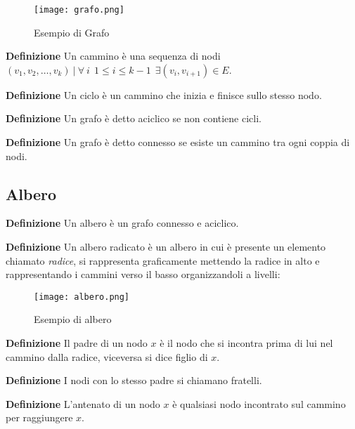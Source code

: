 \documentclass{article}
\begin{document}
\begin{figure}[ht]
    \centering
    \texttt{[image: grafo.png]}
    \caption{Esempio di Grafo}
    \label{fig:grafo}
\end{figure}

\noindent\textbf{Definizione} Un cammino è una sequenza di nodi $(v_1,v_2,\ldots,v_k)\ |\ \forall\ i\ \ 1\leq i\leq k-1\ \ \exists(v_i,v_{i+1})\in E $.\newline 

\noindent\textbf{Definizione} Un ciclo è un cammino che inizia e finisce sullo stesso nodo.\newline

\noindent\textbf{Definizione} Un grafo è detto aciclico se non contiene cicli.\newline

\noindent\textbf{Definizione} Un grafo è detto connesso se esiste un cammino tra ogni coppia di nodi.

\newpage

\subsection{Albero}

\textbf{Definizione} Un albero è un grafo connesso e aciclico.\newline

\noindent\textbf{Definizione} Un albero radicato è un albero in cui è presente un elemento chiamato \textit{radice}, si rappresenta graficamente mettendo la radice in alto e rappresentando i cammini verso il basso organizzandoli a livelli:

\begin{figure}[ht]
    \centering
    \texttt{[image: albero.png]}
    \caption{Esempio di albero}
    \label{fig:albero}
\end{figure}

\noindent\textbf{Definizione} Il padre di un nodo $x$ è il nodo che si incontra prima di lui nel cammino dalla radice, viceversa si dice figlio di $x$.\newline

\noindent\textbf{Definizione} I nodi con lo stesso padre si chiamano fratelli.\newline

\noindent\textbf{Definizione} L'antenato di un nodo $x$ è qualsiasi nodo incontrato sul cammino per raggiungere $x$.\newline
\end{document}
